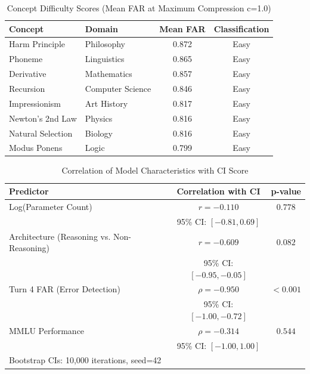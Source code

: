 \begin{table}[h]
\centering
\caption{Concept Difficulty Scores (Mean FAR at Maximum Compression c=1.0)}
\label{tab:concept_difficulty}
\begin{tabular}{llcc}
\toprule
\textbf{Concept} & \textbf{Domain} & \textbf{Mean FAR} & \textbf{Classification} \\
\midrule
Harm Principle & Philosophy & 0.872 & Easy \\
Phoneme & Linguistics & 0.865 & Easy \\
Derivative & Mathematics & 0.857 & Easy \\
Recursion & Computer Science & 0.846 & Easy \\
Impressionism & Art History & 0.817 & Easy \\
Newton's 2nd Law & Physics & 0.816 & Easy \\
Natural Selection & Biology & 0.816 & Easy \\
Modus Ponens & Logic & 0.799 & Easy \\
\bottomrule
\end{tabular}
\end{table}


\begin{table}[h]
\centering
\caption{Correlation of Model Characteristics with CI Score}
\label{tab:correlations}
\begin{tabular}{lcc}
\toprule
\textbf{Predictor} & \textbf{Correlation with CI} & \textbf{p-value} \\
\midrule
Log(Parameter Count) & $r = -0.110$ & $0.778$ \\
  & 95\% CI: $[-0.81, 0.69]$ & \\
Architecture (Reasoning vs. Non-Reasoning) & $r = -0.609$ & $0.082$ \\
  & 95\% CI: $[-0.95, -0.05]$ & \\
Turn 4 FAR (Error Detection) & $\rho = -0.950$ & $< 0.001$ \\
  & 95\% CI: $[-1.00, -0.72]$ & \\
MMLU Performance & $\rho = -0.314$ & $0.544$ \\
  & 95\% CI: $[-1.00, 1.00]$ & \\
\bottomrule
\multicolumn{3}{l}{\footnotesize Bootstrap CIs: 10,000 iterations, seed=42} \\
\end{tabular}
\end{table}


